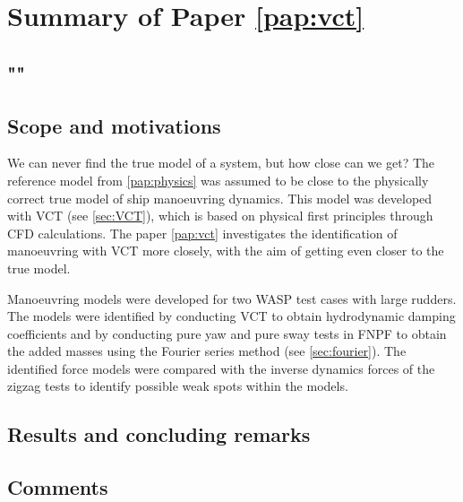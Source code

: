 \section{Summary of Paper \ref{pap:vct}}
\subsection*{""}
\subsection*{Scope and motivations}
We can never find the true model of a system, but how close can we get? The reference model from \ref{pap:physics} was assumed to be close to the physically correct true model of ship manoeuvring dynamics. This model was developed with VCT (see \ref{sec:VCT}), which is based on physical first principles through CFD calculations. The paper \ref{pap:vct} investigates the identification of manoeuvring with VCT more closely, with the aim of getting even closer to the true model.

Manoeuvring models were developed for two WASP test cases with large rudders. The models were identified by conducting VCT to obtain hydrodynamic damping coefficients and by conducting pure yaw and pure sway tests in FNPF to obtain the added masses using the Fourier series method (see \autoref{sec:fourier}). The identified force models were compared with the inverse dynamics forces of the zigzag tests to identify possible weak spots within the models.

\subsection*{Results and concluding remarks}
\subsection*{Comments}
\clearpage